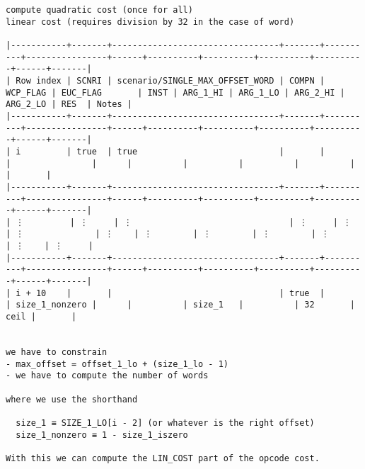 \documentclass[varwidth=\maxdimen,margin=0.5cm,multi={verbatim}]{standalone}
\begin{document}
\begin{verbatim}
compute quadratic cost (once for all)
linear cost (requires division by 32 in the case of word)

|-----------+-------+---------------------------------+-------+----------+----------------+------+----------+----------+----------+----------+------+-------|
| Row index | SCNRI | scenario/SINGLE_MAX_OFFSET_WORD | COMPN | WCP_FLAG | EUC_FLAG       | INST | ARG_1_HI | ARG_1_LO | ARG_2_HI | ARG_2_LO | RES  | Notes |
|-----------+-------+---------------------------------+-------+----------+----------------+------+----------+----------+----------+----------+------+-------|
| i         | true  | true                            |       |          |                |      |          |          |          |          |      |       |
|-----------+-------+---------------------------------+-------+----------+----------------+------+----------+----------+----------+----------+------+-------|
| ⋮         | ⋮     | ⋮                               | ⋮     | ⋮        | ⋮              | ⋮    | ⋮        | ⋮        | ⋮        | ⋮        | ⋮    | ⋮     |
|-----------+-------+---------------------------------+-------+----------+----------------+------+----------+----------+----------+----------+------+-------|
| i + 10    |       |                                 | true  |          | size_1_nonzero |      |          | size_1   |          | 32       | ceil |       |
     

we have to constrain
- max_offset = offset_1_lo + (size_1_lo - 1)
- we have to compute the number of words

where we use the shorthand

  size_1 ≡ SIZE_1_LO[i - 2] (or whatever is the right offset)
  size_1_nonzero ≡ 1 - size_1_iszero

With this we can compute the LIN_COST part of the opcode cost.



\end{verbatim}
\end{document}
